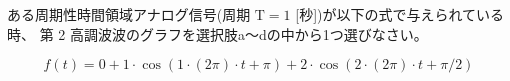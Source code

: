ある周期性時間領域アナログ信号(周期 $\textrm{T} = 1$ [秒])が以下の式で与えられている時、
第 2 高調波波のグラフを選択肢a〜dの中から1つ選びなさい。

\[
f(t) = 
0
+ 1 \cdot \cos( 1 \cdot ( 2 \pi ) \cdot t + \pi)
+ 2 \cdot \cos( 2 \cdot ( 2 \pi ) \cdot t + \pi/2 )
\]
